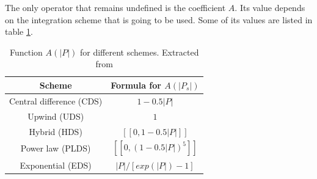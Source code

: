 The only operator that remains undefined is the coefficient $A$. Its value depends on the integration scheme that is going to be used. Some of its values are listed in table \ref{Patankarvalues}.
\begin{table}[h]
	\centering
	\begin{tabular}{ |c|c| }
		\hline
		Scheme & Formula for $A\left(|P_{s}|\right)$ \\ \hline
		Central difference (CDS) & $1-0.5|P|$ \\ \hline
		Upwind (UDS) & $1$ \\ \hline
		Hybrid (HDS) & $[\![0,1-0.5|P|]\!]$ \\ \hline
		Power law (PLDS) & $[\![0,\left(1-0.5|P|\right)^{5}]\!]$ \\ \hline
		Exponential (EDS) & $|P|/\left[exp\left(|P|\right)-1\right]$ \\ \hline
	\end{tabular}
	\caption[Function $A(|P|)$ for different schemes]{Function $A(|P|)$ for different schemes. Extracted from \cite{Patankar1980}}
	\label{Patankarvalues}
\end{table}
